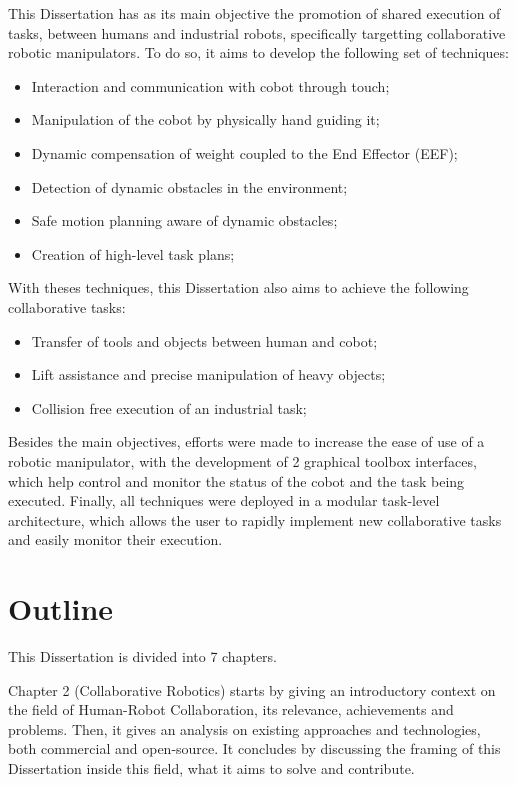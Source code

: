 \par This Dissertation has as its main objective the promotion of shared execution of tasks, between humans and industrial robots, specifically targetting collaborative robotic manipulators. To do so, it aims to develop the following set of techniques:

\begin{itemize}
    \item Interaction and communication with cobot through touch;
    \item Manipulation of the cobot by physically hand guiding it;
    \item Dynamic compensation of weight coupled to the End Effector (EEF);
    \item Detection of dynamic obstacles in the environment;
    \item Safe motion planning aware of dynamic obstacles;
    \item Creation of high-level task plans;
\end{itemize}

\par With theses techniques, this Dissertation also aims to achieve the following collaborative tasks:

\begin{itemize}
    \item Transfer of tools and objects between human and cobot;
    \item Lift assistance and precise manipulation of heavy objects;
    \item Collision free execution of an industrial task;
\end{itemize}

\par Besides the main objectives, efforts were made to increase the ease of use of a robotic manipulator, with the development of 2 graphical toolbox interfaces, which help control and monitor the status of the cobot and the task being executed. Finally, all techniques were deployed in a modular task-level architecture, which allows the user to rapidly implement new collaborative tasks and easily monitor their execution.



\section{Outline}

\par This Dissertation is divided into 7 chapters.
\par Chapter 2 (Collaborative Robotics) starts by giving an introductory context on the field of Human-Robot Collaboration, its relevance, achievements and problems. Then, it gives an analysis on existing approaches and technologies, both commercial and open-source. It concludes by discussing the framing of this Dissertation inside this field, what it aims to solve and contribute.

